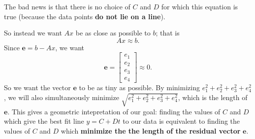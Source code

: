 \documentclass[10pt]{article}
\theoremstyle{definition}
\newtheorem{remark}[theorem]{Remark}
\newcommand{\1}[1]{\textbf{1}_{\left[#1\right]}} %
\begin{document}

The bad news is that there is no choice of $C$ and $D$ for which this equation
is true (because the data points \textbf{do not lie on a line}).

So
instead we want $Ax$ be as close as possible to $b$; that is
\begin{equation*}
  Ax\approx b.
\end{equation*}
Since $\mathbf{e}= b-Ax$, we want
\begin{equation*}
  \mathbf{e} =
  \begin{bmatrix}
    e_{1}\\e_{2}\\e_{3}\\e_{4}
  \end{bmatrix}
  \approx 0.
\end{equation*}
So we want the vector $\mathbf{e}$ to be as tiny as possible. By minimizing
$e_{1}^{2}+e_{2}^{2}+e_{3}^{2}+e_{4}^{2}$, we will also simultaneously
minimize $\sqrt{e_{1}^{2}+e_{2}^{2}+e_{3}^{2}+e_{4}^{2}}$, which is the length
of $\mathbf{e}$. This gives a geometric intepretation of our goal: finding the
values of $C$ and $D$ which give the best fit line $y=C+Dt$ to our data is
equivalent to finding the values of $C$ and $D$ which \textbf{minimize the the
  length of the residual vector} $\mathbf{e}$.
\end{document}
